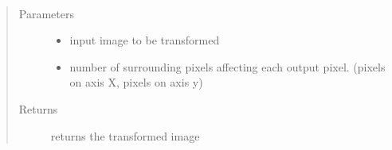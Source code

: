 \documentclass[letterpaper,10pt,english]{sphinxmanual}
\begin{document}
\begin{fulllineitems}
\label{\detokenize{ida_lib.operations:ida_lib.operations.pixel_ops_functional.gaussian_blur}}~\begin{quote}\begin{description}
\item[{Parameters}] \leavevmode\begin{itemize}
\item {} 
 \textendash{} input image to be transformed

\item {} 
 \textendash{} number of surrounding pixels affecting each output pixel. (pixels on axis X, pixels on axis y)

\end{itemize}

\item[{Returns}] \leavevmode
returns the transformed image

\end{description}\end{quote}

\end{fulllineitems}

\end{document}
